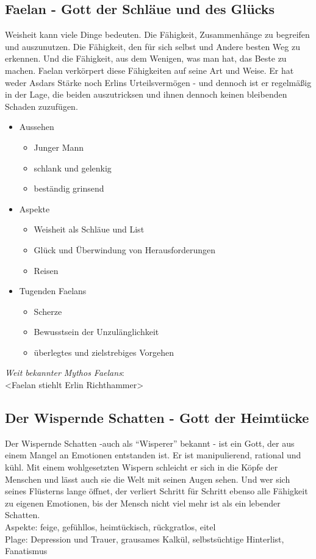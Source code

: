 \subsection{\textbf{Faelan} - Gott der Schläue und des Glücks}
Weisheit kann viele Dinge bedeuten. Die Fähigkeit, Zusammenhänge zu begreifen und auszunutzen. Die Fähigkeit, den für sich selbst und Andere besten Weg zu erkennen. Und die 
Fähigkeit, aus dem Wenigen, was man hat, das Beste zu machen. Faelan verkörpert diese Fähigkeiten auf seine Art und Weise. Er hat weder Asdars Stärke noch Erlins Urteilsvermögen - 
und dennoch ist er regelmäßig in der Lage, die beiden auszutricksen und ihnen dennoch keinen bleibenden Schaden zuzufügen.\\
\begin{itemize}
	\item Aussehen 
	\begin{itemize}
		\item Junger Mann 
		\item schlank und gelenkig
		\item beständig grinsend
	\end{itemize}
	\item Aspekte
	\begin{itemize}
		\item Weisheit als Schläue und List
		\item Glück und Überwindung von Herausforderungen
		\item Reisen 
	\end{itemize}
	\item Tugenden Faelans
	\begin{itemize}
		\item Scherze 
		\item Bewusstsein der Unzulänglichkeit
		\item überlegtes und zielstrebiges Vorgehen
	\end{itemize}
\end{itemize}
\textit{Weit bekannter Mythos Faelans}:\\
<Faelan stiehlt Erlin Richthammer>  


\subsection{\textbf{Der Wispernde Schatten} - Gott der Heimtücke}
Der Wispernde Schatten -auch als ``Wisperer'' bekannt - ist ein Gott, der aus einem Mangel an Emotionen entstanden ist. Er ist manipulierend, rational und kühl. Mit einem 
wohlgesetzten Wispern schleicht er sich in die Köpfe der Menschen und lässt auch sie die Welt mit seinen Augen sehen. Und wer sich seines Flüsterns lange öffnet, der verliert 
Schritt für Schritt ebenso alle Fähigkeit zu eigenen Emotionen, bis der Mensch nicht viel mehr ist als ein lebender Schatten.\\
Aspekte: feige, gefühllos, heimtückisch, rückgratlos, eitel\\
Plage: Depression und Trauer, grausames Kalkül, selbstsüchtige Hinterlist, Fanatismus

